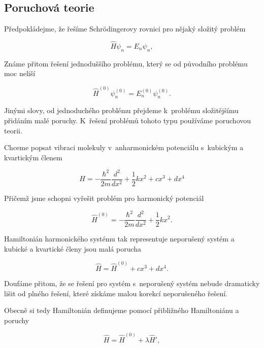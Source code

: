 \subsection{Poruchová teorie}
\label{kap:PoruchovaTeorie}
 
Předpokládejme, že řešíme Schr\"odingerovy rovnici pro nějaký složitý problém

\begin{equation}
\hat{H}\psi_n=E_n \psi_n,
\end{equation}


\noindent Známe přitom řešení jednoduššího problému, který se od původního problému moc neliší
 
\begin{equation}
\hat{H}^{(0)}\psi_n^{(0)}=E_n^{(0)} \psi_n^{(0)}.
\end{equation}
 
\noindent Jinými slovy, od jednoduchého problému přejdeme k~problému složitějšímu přidáním malé poruchy. K~řešení problémů tohoto typu používáme poruchovou teorii.
 
\begin{priklad} 
Chceme popsat vibraci molekuly v~anharmonickém potenciálu s~kubickým a kvartickým členem
  
\begin{equation}
\hat{H}=-\frac{\hbar^2}{2m}\frac{d^2}{dx^2}+\frac{1}{2}kx^2+cx^3+dx^4
\nonumber
\end{equation}
 
Přičemž jsme schopni vyřešit problém pro harmonický potenciál
 
\begin{equation}
\hat{H}^{(0)}=-\frac{\hbar^2}{2m}\frac{d^2}{dx^2}+\frac{1}{2}kx^2.
\nonumber
\end{equation}
 
Hamiltonián harmonického systému tak representuje neporušený systém a kubické a kvartické členy jsou malá porucha
 
\begin{equation}
\hat{H}=\hat{H}^{(0)}+cx^3+dx^4.
\end{equation}

Doufáme přitom, že se řešení pro systém s~neporušený systém nebude dramaticky lišit od plného řešení, které získáme malou korekcí neporušeného řešení.
\end{priklad}

Obecně si tedy Hamiltonián definujeme pomocí přibližného Hamiltoniánu a poruchy

\begin{equation}
\hat{H}=\hat{H}^{(0)}+\lambda\hat{H}',
\label{rov:approx:ham}
\end{equation}

